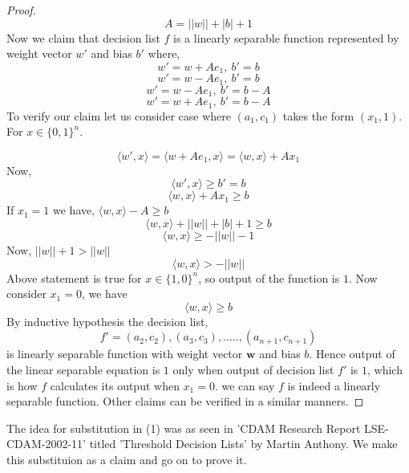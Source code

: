 \begin{proof}
\begin{equation}
A = ||w|| + |b| + 1
\end{equation}
Now we claim that decision list $f$ is a linearly separable function represented by weight vector $w'$ and bias $b'$ where,
$$w' = w + Ae_1, \ b' = b$$
$$w' = w - Ae_1, \ b' = b$$
$$w' = w - Ae_1, \ b' = b - A$$
$$w' = w + Ae_1, \ b' = b - A$$
To verify our claim let us consider case where $(a_1, c_1)$ takes the form $(x_1, 1)$. For $x \in \{0, 1\}^n$.

$$\langle w', x \rangle = \langle w + Ae_1, x \rangle = \langle w,x \rangle + Ax_1$$
Now,
$$\langle w', x \rangle \geq b' = b$$
$$ \langle w,x \rangle + Ax_1 \geq b$$
If $x_1 = 1$ we have, $ \langle w,x \rangle - A \geq b$\\
$$ \langle w,x \rangle + ||w|| + |b| + 1 \geq b$$
$$ \langle w,x \rangle \geq - ||w|| - 1$$
Now, $||w|| + 1 > ||w||$
$$ \langle w,x \rangle > -||w||$$ Above statement is true for $x \in \{1,0\}^n$, so output of the function is $1$. Now consider $x_1 = 0$, we have
$$\langle w,x \rangle \geq b$$
By inductive hypothesis the decision list,
$$f' = (a_2,c_2), (a_3,c_3), ..... ,(a_{n+1},c_{n+1})$$
is linearly separable function with weight vector $\boldsymbol w$ and bias $b$. Hence output of the linear separable equation is $1$ only when output of decision list $f'$ is $1$, which is how $f$ calculates its output when $x_1 = 0$. we can say $f$ is indeed a linearly separable function. Other claims can be verified in a similar manners.


\end{proof}

The idea for substitution in (1) was as seen in 'CDAM Research Report LSE-CDAM-2002-11' titled 'Threshold Decision Lists' by Martin Anthony. We make this substituion as a claim and go on to prove it.



